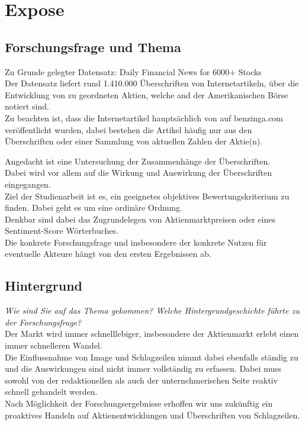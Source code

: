 \chapter{Expose}
\section{Forschungsfrage und Thema}

Zu Grunde gelegter Datensatz: 
Daily Financial News for 6000+ Stocks
\citep[see][]{dailyfinancialnews} \\
Der Datensatz liefert rund 1.410.000 Überschriften von Internetartikeln, über die Entwicklung von zu geordneten Aktien, welche and der Amerikanischen Börse notiert sind.\\
Zu beachten ist, dass die Internetartikel hauptsächlich von auf benzinga.com veröffentlicht wurden, dabei bestehen die Artikel häufig nur aus den Überschriften oder einer Sammlung von aktuellen Zahlen der Aktie(n).

Angedacht ist eine Untersuchung der Zusammenhänge der Überschriften. \\
Dabei wird vor allem auf die Wirkung und Auswirkung der Überschriften eingegangen. \\
Ziel der Studienarbeit ist es, ein geeignetes objektives Bewertungskriterium zu finden. Dabei geht es um eine ordinäre Ordnung. \\
Denkbar sind dabei das Zugrundelegen von Aktienmarktpreisen oder eines Sentiment-Score Wörterbuches. \\

Die konkrete Forschungsfrage und insbesondere der konkrete Nutzen für eventuelle Akteure hängt von den ersten Ergebnissen ab.

\section{Hintergrund}
{\scriptsize \textit{Wie sind Sie auf das Thema gekommen? Welche Hintergrundgeschichte führte zu der Forschungsfrage?}}\\
Der Markt wird immer schnelllebiger, insbesondere der Aktienmarkt erlebt einen immer schnelleren Wandel.\\
Die Einflussnahme von Image und Schlagzeilen nimmt dabei ebenfalls ständig zu und die Auswirkungen sind nicht immer vollständig zu erfassen.
Dabei muss sowohl von der redaktionellen als auch der unternehmerischen Seite reaktiv schnell gehandelt werden.\\
Nach Möglichkeit der Forschungsergebnisse erhoffen wir uns zukünftig ein proaktives Handeln auf Aktienentwicklungen und Überschriften von Schlagzeilen.

